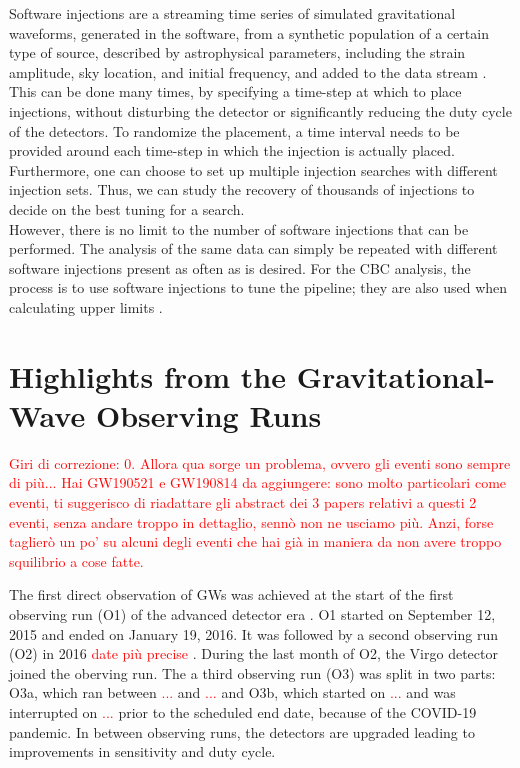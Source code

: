 \documentclass[binding=0.6cm, LaM]{sapthesis}
\newcommand{\fpg}[1]{\textcolor{red}{#1} }
\begin{document}
	Software injections are a streaming time series of simulated gravitational waveforms, 
	generated in the software, from a synthetic population of a certain type of source, 
	described by astrophysical parameters, including the strain amplitude, sky location, 	
	and initial frequency, and added to the data stream \cite{30}. 
	This can be done many times, by specifying a time-step at which to place injections, 
	without disturbing the detector or significantly reducing the duty cycle of the detectors. 
	To randomize the placement, a time interval needs to be provided around 
	each time-step in which the injection is actually placed. 
	Furthermore, one can choose to set up multiple injection searches with different injection sets. 
	Thus, we can study the recovery of thousands of injections to decide on the best tuning for a search. \\ 
	However, there is no limit to the number of software injections that can be performed. 
	The analysis of the same data can simply be repeated with different software injections present as often as is desired. 
	For the CBC analysis, the process is to use software injections to tune the pipeline; 
	they are also used when calculating upper limits \cite{47}.
	
\chapter{Highlights from the Gravitational-Wave Observing Runs}
\fpg{Giri di correzione: 0.}%
\fpg{Allora qua sorge un problema, ovvero gli eventi sono sempre di pi\`u...  Hai GW190521 e GW190814 da aggiungere: sono molto particolari come eventi, ti suggerisco di riadattare gli abstract dei 3 papers relativi a questi 2 eventi, senza andare troppo in dettaglio, senn\`o non ne usciamo pi\`u.  Anzi, forse taglier\`o un po' su alcuni degli eventi che hai gi\`a in maniera da non avere troppo squilibrio a cose fatte.}%

	The first direct observation of GWs was achieved at the start of the first observing run (O1) of the advanced detector era \cite{52}.  O1 started on September 12, 2015 and ended on January 19, 2016.  It was followed by a second observing run (O2) in 2016 \fpg{date pi\`u precise}.  During the last month of O2, the Virgo detector joined the oberving run.  The a third observing run (O3) was split in two parts: O3a, which ran between \fpg{...} and \fpg{...} and O3b, which started on \fpg{...} and was interrupted on \fpg{...} prior to the scheduled end date, because of the COVID-19 pandemic.  In between observing runs, the detectors are upgraded leading to improvements in sensitivity and duty cycle.
\end{document}

